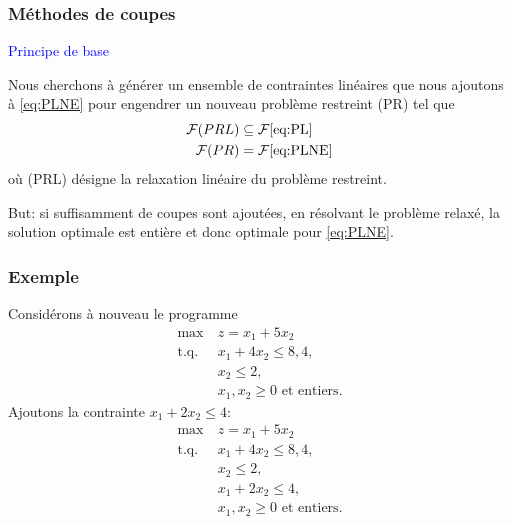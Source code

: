 \documentclass[usepdftitle=false]{beamer}
\def\cF{\mathcal{F}}
\def\st{\mbox{t.q. }}
\begin{document}
\begin{frame}
\frametitle{Méthodes de coupes}

\textcolor{blue}{Principe de base}

\mbox{}

Nous cherchons à générer un ensemble de contraintes
linéaires que nous ajoutons à \eqref{eq:PLNE}
pour engendrer un nouveau
problème restreint (PR) tel que
\begin{align*}
\cF{(PRL)} &\subseteq \cF \eqref{eq:PL} \\
\cF{(PR)} &= \cF\eqref{eq:PLNE}
\end{align*}
où (PRL) désigne la relaxation linéaire du problème restreint.

\mbox{}

But: si suffisamment de coupes sont ajoutées, en résolvant le problème relaxé, la solution optimale est entière et donc optimale pour \eqref{eq:PLNE}.

\end{frame}

\begin{frame}
\frametitle{Exemple}

Considérons à nouveau le programme
\begin{align*}
	\max\ & z = x_1+5x_2\\
	\st & x_1+4x_2 \leq 8,4, \\
	& x_2 \leq 2, \\
	& x_1, x_2 \geq 0 \mbox{ et entiers}.
\end{align*}
Ajoutons la contrainte $x_1 + 2x_2 \leq 4$:
\begin{align*}
	\max\ & z = x_1+5x_2\\
	\st & x_1+4x_2 \leq 8,4, \\
	& x_2 \leq 2, \\
	& x_1 + 2x_2 \leq 4, \\
	& x_1, x_2 \geq 0 \mbox{ et entiers}.
\end{align*}

\end{frame}
\end{document}
